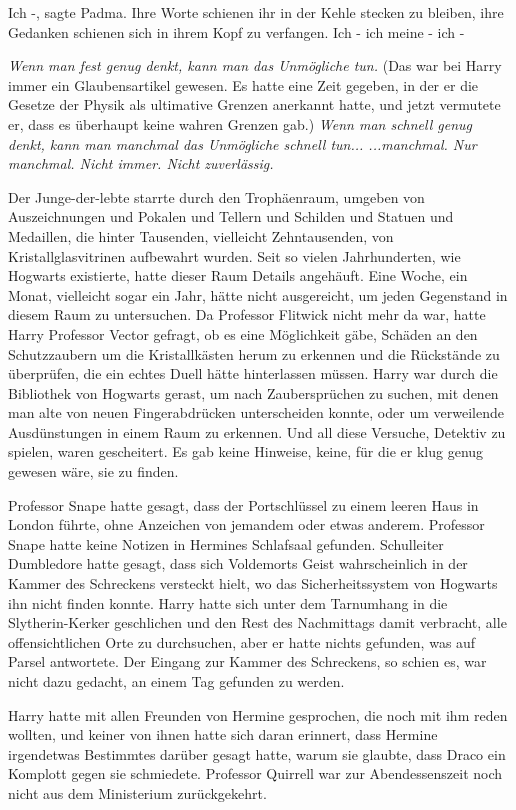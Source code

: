 \glqq Ich -\grqq{}, sagte Padma. Ihre Worte schienen ihr in der Kehle stecken zu
bleiben, ihre Gedanken schienen sich in ihrem Kopf zu verfangen. \glqq Ich - ich
meine - ich -\grqq{}

\emph{Wenn man fest genug denkt, kann man das Unmögliche tun. }
(Das war bei Harry immer ein Glaubensartikel gewesen. Es hatte eine Zeit
gegeben, in der er die Gesetze der Physik als ultimative Grenzen anerkannt
hatte, und jetzt vermutete er, dass es überhaupt keine wahren Grenzen gab.)
\emph{Wenn man schnell genug denkt, kann man manchmal das Unmögliche schnell tun... ...manchmal. Nur manchmal. Nicht immer. Nicht zuverlässig. }

Der Junge-der-lebte starrte durch den Trophäenraum, umgeben von Auszeichnungen
und Pokalen und Tellern und Schilden und Statuen und Medaillen, die hinter
Tausenden, vielleicht Zehntausenden, von Kristallglasvitrinen aufbewahrt wurden.
Seit so vielen Jahrhunderten, wie Hogwarts existierte, hatte dieser Raum Details
angehäuft. Eine Woche, ein Monat, vielleicht sogar ein Jahr, hätte nicht
ausgereicht, um jeden Gegenstand in diesem Raum zu untersuchen. Da Professor
Flitwick nicht mehr da war, hatte Harry Professor Vector gefragt, ob es eine
Möglichkeit gäbe, Schäden an den Schutzzaubern um die Kristallkästen herum zu
erkennen und die Rückstände zu überprüfen, die ein echtes Duell hätte
hinterlassen müssen. Harry war durch die Bibliothek von Hogwarts gerast, um nach
Zaubersprüchen zu suchen, mit denen man alte von neuen Fingerabdrücken
unterscheiden konnte, oder um verweilende Ausdünstungen in einem Raum zu
erkennen. Und all diese Versuche, Detektiv zu spielen, waren gescheitert. Es gab
keine Hinweise, keine, für die er klug genug gewesen wäre, sie zu finden.

Professor Snape hatte gesagt, dass der Portschlüssel zu einem leeren Haus in
London führte, ohne Anzeichen von jemandem oder etwas anderem. Professor Snape
hatte keine Notizen in Hermines Schlafsaal gefunden. Schulleiter Dumbledore
hatte gesagt, dass sich Voldemorts Geist wahrscheinlich in der Kammer des
Schreckens versteckt hielt, wo das Sicherheitssystem von Hogwarts ihn nicht
finden konnte. Harry hatte sich unter dem Tarnumhang in die Slytherin-Kerker
geschlichen und den Rest des Nachmittags damit verbracht, alle offensichtlichen
Orte zu durchsuchen, aber er hatte nichts gefunden, was auf Parsel antwortete.
Der Eingang zur Kammer des Schreckens, so schien es, war nicht dazu gedacht, an
einem Tag gefunden zu werden.

Harry hatte mit allen Freunden von Hermine gesprochen, die noch mit ihm reden
wollten, und keiner von ihnen hatte sich daran erinnert, dass Hermine
irgendetwas Bestimmtes darüber gesagt hatte, warum sie glaubte, dass Draco ein
Komplott gegen sie schmiedete. Professor Quirrell war zur Abendessenszeit noch
nicht aus dem Ministerium zurückgekehrt.

